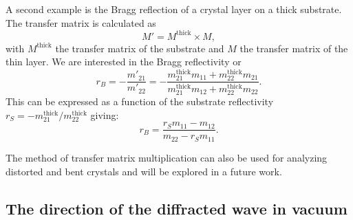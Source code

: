 \documentclass{iucr}
\begin{document}
A second example is the Bragg reflection of a crystal layer on a thick substrate. The transfer matrix is calculated as
\begin{equation}
    M' = M^{\text{thick}} \times M,
\end{equation}
with $M^{\text{thick}}$ the transfer matrix of the substrate and $M$ the transfer matrix of the thin layer. We are interested in the Bragg reflectivity or 
\begin{equation}
r_B=-\frac{m'_{21}}{m'_{22}}=
-\frac{m_{21}^{\text{thick}} m_{11} + m_{22}^{\text{thick}} m_{21}}
{m_{21}^{\text{thick}} m_{12} + m_{22}^{\text{thick}} m_{22}}.
\end{equation}
This can be expressed as a function of the substrate reflectivity $r_S=-m_{21}^{\text{thick}}/m_{22}^{\text{thick}}$ giving: 
\begin{equation}
r_B=\frac{r_S m_{11} - m_{12}}
{m_{22}  - r_S m_{11}}.
\end{equation}

 The method of transfer matrix multiplication can also be used for analyzing distorted and bent crystals and will be explored in a future work.
 
\subsection{The direction of the diffracted wave in vacuum}\label{sec:directions}
\end{document}
